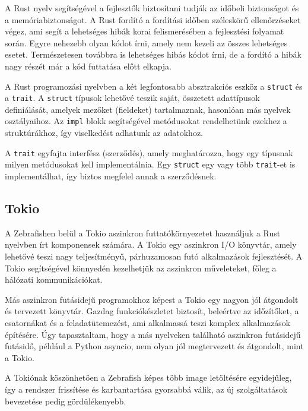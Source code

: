 A Rust nyelv segítségével a fejlesztők biztosítani tudják az időbeli biztonságot és a memóriabiztonságot. A Rust fordító a fordítási időben széleskörű ellenőrzéseket végez, ami segít a lehetséges hibák korai felismerésében a fejlesztési folyamat során. Egyre nehezebb olyan kódot írni, amely nem kezeli az összes lehetséges esetet. Természetesen továbbra is lehetséges hibás kódot írni, de a fordító a hibák nagy részét már a kód futtatása előtt elkapja.

A Rust programozási nyelvben a két legfontosabb absztrakciós eszköz a \texttt{struct} és a \texttt{trait}. A \texttt{struct} típusok lehetővé teszik saját, összetett adattípusok definiálását, amelyek mezőket (fieldeket) tartalmaznak, hasonlóan más nyelvek osztályaihoz. Az \texttt{impl} blokk segítségével metódusokat rendelhetünk ezekhez a struktúrákhoz, így viselkedést adhatunk az adatokhoz.

A \texttt{trait} egyfajta interfész (szerződés), amely meghatározza, hogy egy típusnak milyen metódusokat kell implementálnia. Egy \texttt{struct} egy vagy több \texttt{trait}-et is implementálhat, így biztos megfelel annak a szerződésnek.

\subsection{Tokio}

A Zebrafishen belül a Tokio aszinkron futtatókörnyezetet használjuk a Rust nyelvben írt komponensek számára. A Tokio egy aszinkron I/O könyvtár, amely lehetővé teszi nagy teljesítményű, párhuzamosan futó alkalmazások fejlesztését. A Tokio segítségével könnyedén kezelhetjük az aszinkron műveleteket, főleg a hálózati kommunikációkat.

Más aszinkron futásidejű programokhoz képest a Tokio egy nagyon jól átgondolt és tervezett könyvtár. Gazdag funkciókészletet biztosít, beleértve az időzítőket, a csatornákat és a feladatütemezést, ami alkalmassá teszi komplex alkalmazások építésére. Úgy tapasztaltam, hogy a más nyelveken található aszinkron futásidejű futásidő, például a Python asyncio, nem olyan jól megtervezett és átgondolt, mint a Tokio.

A Tokiónak köszönhetően a Zebrafish képes több image letöltésére egyidejűleg, így a rendszer frissítése és karbantartása gyorsabbá válik, az új szolgáltatások bevezetése pedig gördülékenyebb.